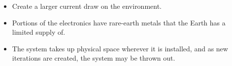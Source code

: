 \documentclass{article}
\begin{document}
\begin{itemize}
    \item Create a larger current draw on the environment.
    \item Portions of the electronics have rare-earth metals that the Earth has a limited supply of.
    \item The system takes up physical space wherever it is installed, and as new iterations are created, the system may be thrown out.
\end{itemize}





%
%
%
%
%
%
%
%
\end{document}
